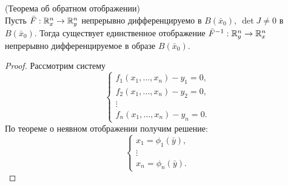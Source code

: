 \begin{theorem} (Теорема об обратном отображении)\\
    Пусть $\bar{F}: \mathbb{R}_x^n\to \mathbb{R}_y^n$ непрерывно дифференцируемо в $B(\bar{x}_0),\ \det{J}\ne 0$ в $B(\bar{x}_0)$. Тогда существует единственное отображение $\bar{F}^{-1}: \mathbb{R}_y^n\to \mathbb{R}_x^n$ непрерывно дифференцируемое в образе $B(\bar{x}_0)$.
\end{theorem} 
\begin{proof}
    Рассмотрим систему
    \[\begin{cases}
        f_1(x_1,\dots,x_n)-y_1=0,\\
        f_2(x_1,\dots,x_n)-y_2=0,\\
        \vdots\\
        f_n(x_1,\dots,x_n)-y_n=0.
    \end{cases}
    \]
    По теореме о неявном отображении получим решение:
    \[\begin{cases}
        x_1=\phi_1(\bar{y}),\\
        \vdots\\
        x_n=\phi_n(\bar{y}).
    \end{cases}
    \]
\end{proof} 
